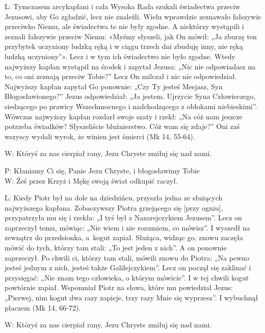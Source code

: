 ﻿\documentclass[9pt,twoside]{extarticle}
\begin{document}
{\hnr L:} Tymczasem arcykapłani i cała Wysoka Rada szukali świadectwa przeciw Jezusowi, aby Go zgładzić, lecz nie znaleźli. Wielu wprawdzie zeznawało fałszywie przeciwko Niemu, ale świadectwa te nie były zgodne. A niektórzy wystąpili i zeznali fałszywie przeciw Niemu: «Myśmy słyszeli, jak On mówił: „Ja zburzę ten przybytek uczyniony ludzką ręką i w ciągu trzech dni zbuduję inny, nie ręką ludzką uczyniony”». Lecz i w tym ich świadectwo nie było zgodne. Wtedy najwyższy kapłan wystąpił na środek i zapytał Jezusa: „Nic nie odpowiadasz na to, co oni zeznają przeciw Tobie?” Lecz On milczał i nic nie odpowiedział. Najwyższy kapłan zapytał Go ponownie: „Czy Ty jesteś Mesjasz, Syn Błogosławionego?” Jezus odpowiedział: „Ja jestem. Ujrzycie Syna Człowieczego, siedzącego po prawicy Wszechmocnego i nadchodzącego z obłokami niebieskimi”. Wówczas najwyższy kapłan rozdarł swoje szaty i rzekł: „Na cóż nam jeszcze potrzeba świadków? Słyszeliście bluźnierstwo. Cóż wam się zdaje?” Oni zaś wszyscy wydali wyrok, że winien jest śmierci (Mk 14, 55-64).


{\hnr W:} Któryś za nas cierpiał rany, Jezu Chryste zmiłuj się nad nami.


{\hnr{}}


{\hnr P:} Kłaniamy Ci się, Panie Jezu Chryste, i błogosławimy Tobie\\
{\hnr W:} Żeś przez Krzyż i Mękę swoją świat odkupić raczył.


{\hnr L:} Kiedy Piotr był na dole na dziedzińcu, przyszła jedna ze służących najwyższego kapłana. Zobaczywszy Piotra grzejącego się [przy ogniu], przypatrzyła mu się i rzekła: „I tyś był z Nazarejczykiem Jezusem”. Lecz on zaprzeczył temu, mówiąc: „Nie wiem i nie rozumiem, co mówisz”. I wyszedł na zewnątrz do przedsionka, a~kogut zapiał. Służąca, widząc go, znowu zaczęła mówić do tych, którzy tam stali: „To jest jeden z nich”. A on ponownie zaprzeczył. Po chwili ci, którzy tam stali, mówili znowu do Piotra: „Na pewno jesteś jednym z nich, jesteś także Galilejczykiem”. Lecz on począł się zaklinać i przysięgać: „Nie znam tego człowieka, o którym mówicie”. I w tej chwili kogut powtórnie zapiał. Wspomniał Piotr na słowa, które mu powiedział Jezus: „Pierwej, nim kogut dwa razy zapieje, trzy razy Mnie się wyprzesz”. I wybuchnął płaczem (Mk 14, 66-72).


{\hnr W:} Któryś za nas cierpiał rany, Jezu Chryste zmiłuj się nad nami.


{\hnr{}}
\end{document}
